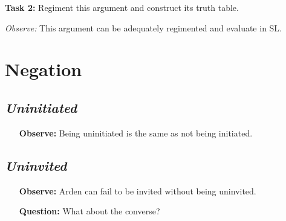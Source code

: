 \documentclass[a4paper, 11pt]{article} %
\begin{document}
\begin{enumerate}
\end{enumerate}

\noindent
\textbf{Task 2:} Regiment this argument and construct its truth table.
\vspace{.05in}

\noindent
\textit{Observe:} This argument can be adequately regimented and evaluate in SL.






\section*{Negation}

\subsection*{\it \textbf{Uninitiated}}

\begin{earg}
\end{earg}

\begin{itemize}[leftmargin=1in,labelsep=.15in] %
  \item[\bf Observe:] Being uninitiated is the same as not being initiated.
\end{itemize}





\subsection*{\it \textbf{Uninvited}}

\begin{earg}
\end{earg}

\begin{itemize}[leftmargin=1in,labelsep=.15in] %
  \item[\bf Observe:] Arden can fail to be invited without being uninvited.
  \item[\bf Question:] What about the converse?
\end{itemize}
\end{document}

